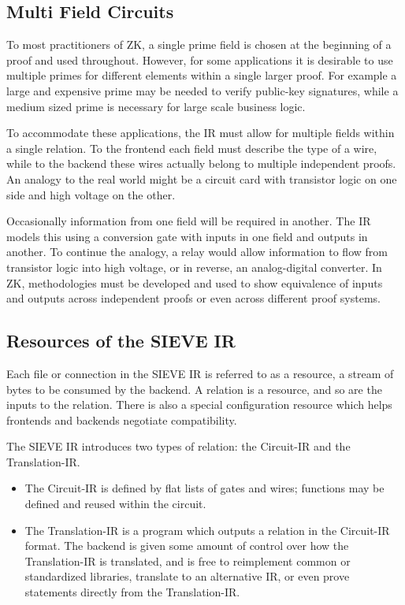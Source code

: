 \subsection{Multi Field Circuits}
To most practitioners of ZK, a single prime field is chosen at the beginning of a proof and used throughout.
However, for some applications it is desirable to use multiple primes for different elements within a single larger proof.
For example a large and expensive prime may be needed to verify public-key signatures, while a medium sized prime is necessary for large scale business logic.

To accommodate these applications, the IR must allow for multiple fields within a single relation.
To the frontend each field must describe the type of a wire, while to the backend these wires actually belong to multiple independent proofs.
An analogy to the real world might be a circuit card with transistor logic on one side and high voltage on the other.

Occasionally information from one field will be required in another.
The IR models this using a conversion gate with inputs in one field and outputs in another.
To continue the analogy, a relay would allow information to flow from transistor logic into high voltage, or in reverse, an analog-digital converter.
In ZK, methodologies must be developed and used to show equivalence of inputs and outputs across independent proofs or even across different proof systems.

\subsection{Resources of the SIEVE IR}
Each file or connection in the SIEVE IR is referred to as a resource, a stream of bytes to be consumed by the backend.
A relation is a resource, and so are the inputs to the relation.
There is also a special configuration resource which helps frontends and backends negotiate compatibility.

The SIEVE IR introduces two types of relation: the Circuit-IR and the Translation-IR.
\begin{itemize}
\item The Circuit-IR is defined by flat lists of gates and wires; functions may be defined and reused within the circuit.
\item The Translation-IR is a program which outputs a relation in the Circuit-IR format.
The backend is given some amount of control over how the Translation-IR is translated, and is free to reimplement common or standardized libraries, translate to an alternative IR, or even prove statements directly from the Translation-IR.
\end{itemize}

